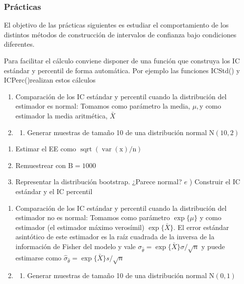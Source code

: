 \documentclass[
]{article}
\providecommand{\tightlist}{%
  \setlength{\itemsep}{0pt}\setlength{\parskip}{0pt}}
\begin{document}
\subsubsection{Prácticas}\label{pruxe1cticas}

El objetivo de las prácticas siguientes es estudiar el comportamiento de los distintos métodos de construcción de intervalos de confianza bajo condiciones diferentes.

Para facilitar el cálculo conviene disponer de una función que construya los IC estándar y percentil de forma automática. Por ejemplo las funciones ICStd() y ICPerc()realizan estos cálculos

\begin{enumerate}
\def\labelenumi{\arabic{enumi}.}
\tightlist
\item
  Comparación de los IC estándar y percentil cuando la distribución del estimador es normal: Tomamos como parámetro la media, \(\mu, \mathrm{y}\) como estimador la media aritmética, \(\bar{X}\)
\item
  \begin{enumerate}
  \def\labelenumii{\alph{enumii})}
  \tightlist
  \item
    Generar muestras de tamaño 10 de una distribución normal \(\mathrm{N}(10,2)\)
  \end{enumerate}
\end{enumerate}

\begin{enumerate}
\def\labelenumi{\alph{enumi})}
\setcounter{enumi}{1}
\tightlist
\item
  Estimar el EE como \(\operatorname{sqrt}(\operatorname{var}(\mathrm{x}) / \mathrm{n})\)
\item
  Remuestrear con \(\mathrm{B}=1000\)
\item
  Representar la distribución bootstrap. ¿Parece normal?
  \(e\) ) Construir el IC estándar y el IC percentil
\end{enumerate}

\begin{enumerate}
\def\labelenumi{\arabic{enumi}.}
\setcounter{enumi}{2}
\tightlist
\item
  Comparación de los IC estándar y percentil cuando la distribución del estimador no es normal: Tomamos como parámetro \(\exp \{\mu\}\) y como estimador (el estimador máximo verosímil) \(\exp \{\bar{X}\}\). El error estándar asintótico de este estimador es la raíz cuadrada de la inversa de la información de Fisher del modelo y vale \(\sigma_{\hat{\theta}}=\exp \{\bar{X}\} \sigma / \sqrt{n}\) y puede estimarse como \(\hat{\sigma}_{\hat{\theta}}=\exp \{\bar{X}\} s / \sqrt{n}\)
\item
  \begin{enumerate}
  \def\labelenumii{\alph{enumii})}
  \tightlist
  \item
    Generar muestras de tamaño 10 de una distribución normal \(\mathrm{N}(0,1)\)
  \end{enumerate}
\end{enumerate}
\end{document}
